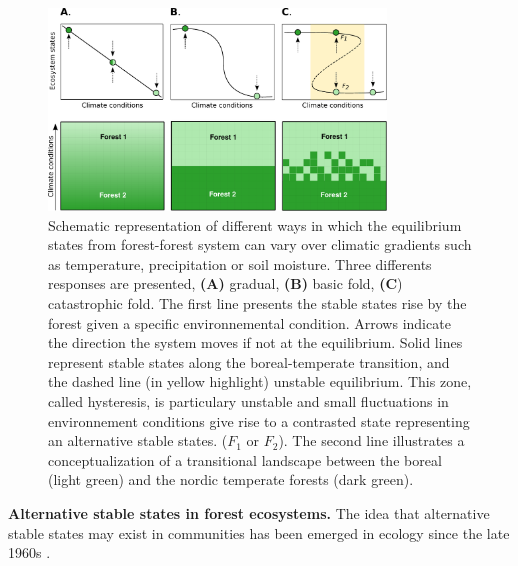 \begin{figure}[t]
	\begin{center}
	\includegraphics[width=0.8\textwidth]{fig/states.pdf}
	\end{center}
	\caption{Schematic representation of different ways in which the equilibrium
	states from forest-forest system can vary over climatic gradients such as temperature, precipitation
	or soil moisture. Three differents responses are presented,
	\textbf{(A)} gradual, \textbf{(B)} basic fold, \textbf{(C}) catastrophic fold.
	The first line presents the stable states rise by the forest
	given a specific environnemental condition. Arrows indicate the
	direction the system moves if not at the equilibrium. 
	Solid lines represent stable states along the boreal-temperate
	transition, and the dashed line (in yellow highlight) unstable equilibrium. This zone,
	called hysteresis, is particulary unstable and small fluctuations in
	environnement conditions give rise to a contrasted state representing an
	alternative stable states. ($F_1$ or $F_2$). 
	The second line illustrates a conceptualization of a transitional landscape
	between the boreal (light green) and the nordic temperate forests (dark
	green).}
	\label{fig1}
	\vspace{-1.25em}
\end{figure}



\textbf{Alternative stable states in forest ecosystems.} The idea that
alternative stable states may exist in communities has been emerged in ecology
since the late 1960s \cite{Scheffer2001,Society2014a}. 

